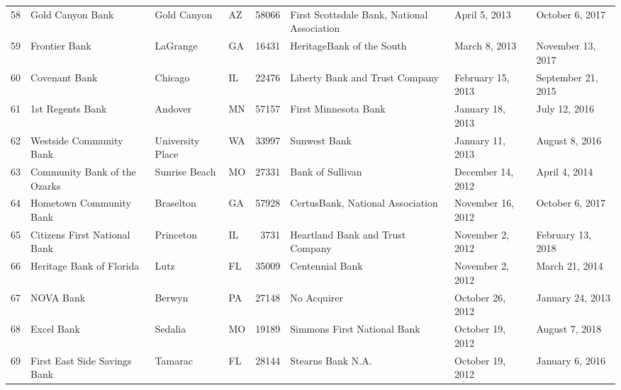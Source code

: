 \begin{tabular}{llllrlll}
58  &                                   Gold Canyon Bank &         Gold Canyon &  AZ &  58066 &        First Scottsdale Bank, National Association &       April 5, 2013 &     October 6, 2017 \\
59  &                                      Frontier Bank &            LaGrange &  GA &  16431 &                          HeritageBank of the South &       March 8, 2013 &   November 13, 2017 \\
60  &                                      Covenant Bank &             Chicago &  IL &  22476 &                     Liberty Bank and Trust Company &   February 15, 2013 &  September 21, 2015 \\
61  &                                   1st Regents Bank &             Andover &  MN &  57157 &                               First Minnesota Bank &    January 18, 2013 &       July 12, 2016 \\
62  &                            Westside Community Bank &    University Place &  WA &  33997 &                                       Sunwest Bank &    January 11, 2013 &      August 8, 2016 \\
63  &                       Community Bank of the Ozarks &       Sunrise Beach &  MO &  27331 &                                   Bank of Sullivan &   December 14, 2012 &       April 4, 2014 \\
64  &                            Hometown Community Bank &           Braselton &  GA &  57928 &                   CertusBank, National Association &   November 16, 2012 &     October 6, 2017 \\
65  &                       Citizens First National Bank &           Princeton &  IL &   3731 &                   Heartland Bank and Trust Company &    November 2, 2012 &   February 13, 2018 \\
66  &                           Heritage Bank of Florida &                Lutz &  FL &  35009 &                                    Centennial Bank &    November 2, 2012 &      March 21, 2014 \\
67  &                                          NOVA Bank &              Berwyn &  PA &  27148 &                                        No Acquirer &    October 26, 2012 &    January 24, 2013 \\
68  &                                         Excel Bank &             Sedalia &  MO &  19189 &                        Simmons First National Bank &    October 19, 2012 &      August 7, 2018 \\
69  &                       First East Side Savings Bank &             Tamarac &  FL &  28144 &                                  Stearns Bank N.A. &    October 19, 2012 &     January 6, 2016 \\

\end{tabular}
